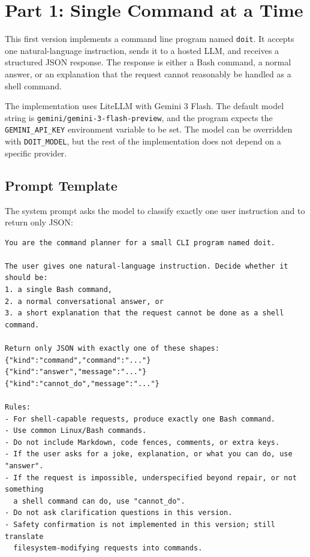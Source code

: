 \section{Part 1: Single Command at a Time}

This first version implements a command line program named \texttt{doit}. It
accepts one natural-language instruction, sends it to a hosted LLM, and receives
a structured JSON response. The response is either a Bash command, a normal
answer, or an explanation that the request cannot reasonably be handled as a
shell command.

The implementation uses LiteLLM with Gemini 3 Flash. The default model string is
\texttt{gemini/gemini-3-flash-preview}, and the program expects the
\texttt{GEMINI\_API\_KEY} environment variable to be set. The model can be
overridden with \texttt{DOIT\_MODEL}, but the rest of the implementation does
not depend on a specific provider.

\subsection{Prompt Template}

The system prompt asks the model to classify exactly one user instruction and to
return only JSON:

\begin{verbatim}
You are the command planner for a small CLI program named doit.

The user gives one natural-language instruction. Decide whether it should be:
1. a single Bash command,
2. a normal conversational answer, or
3. a short explanation that the request cannot be done as a shell command.

Return only JSON with exactly one of these shapes:
{"kind":"command","command":"..."}
{"kind":"answer","message":"..."}
{"kind":"cannot_do","message":"..."}

Rules:
- For shell-capable requests, produce exactly one Bash command.
- Use common Linux/Bash commands.
- Do not include Markdown, code fences, comments, or extra keys.
- If the user asks for a joke, explanation, or what you can do, use "answer".
- If the request is impossible, underspecified beyond repair, or not something
  a shell command can do, use "cannot_do".
- Do not ask clarification questions in this version.
- Safety confirmation is not implemented in this version; still translate
  filesystem-modifying requests into commands.
\end{verbatim}

